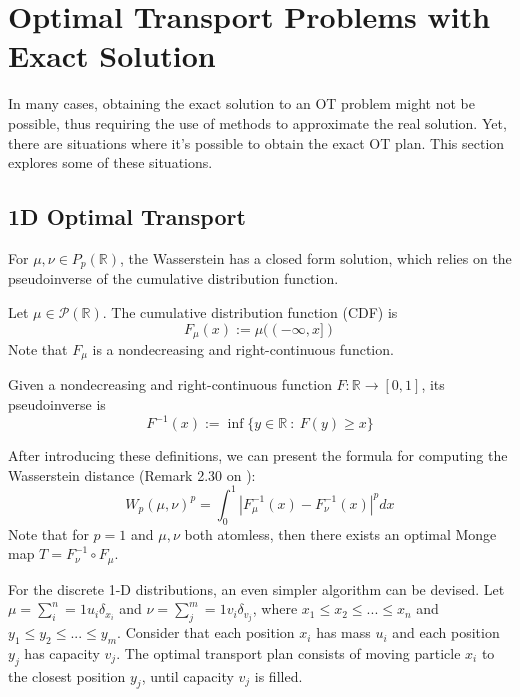 \newpage
\section{Optimal Transport Problems with Exact Solution}

In many cases, obtaining the exact solution to an OT problem might not be possible,
thus requiring the use of methods to approximate the real solution. Yet,
there are situations where it's possible to obtain the exact OT plan. This section
explores some of these situations.

\subsection{1D Optimal Transport}

\label{sec:1dOT}
For $\mu,\nu \in P_p(\mathbb R)$, the Wasserstein has a closed form solution, which
relies on the pseudoinverse of the cumulative distribution function.
\begin{definition}
  Let $\mu \in \mathcal P(\mathbb R)$. The cumulative distribution function (CDF) is
  \begin{equation}
    F_\mu(x) := \mu((-\infty,x])
  \end{equation}
  Note that $F_\mu$ is a nondecreasing and right-continuous function.
  \label{def:cumulativefunction}
\end{definition}

\begin{definition}
  Given a nondecreasing and right-continuous function $F:\mathbb R \to [0,1]$,
  its pseudoinverse is
  \begin{equation}
    F^{-1}(x):= \inf\{
    y \in \mathbb R \ : \ F(y) \geq x
    \}
  \end{equation}
  \label{def:pseudoinverse}
\end{definition}
After introducing these definitions, we can present the formula for computing the Wasserstein
distance (Remark 2.30 on \citet{peyre2019computational}):
\begin{equation}
  W_p(\mu,\nu)^p = \int_0^1| F_\mu^{-1}(x)- F_\nu^{-1}(x) |^p dx
\end{equation}
Note that for $p=1$ and $\mu,\nu$ both atomless, then
there exists an optimal Monge map $T = F_\nu^{-1} \circ F_\mu$.

For the discrete 1-D distributions, an even simpler algorithm can be devised. Let
$\mu = \sum^n_i=1 u_i \delta_{x_i}$ and
$\nu = \sum^m_j=1 v_i \delta_{v_j}$, where
$x_1\leq x_2 \leq ... \leq x_n$ and
$y_1\leq y_2 \leq ... \leq y_m$. Consider that each position $x_i$ has mass $u_i$
and each position $y_j$ has capacity $v_j$. The optimal transport plan
consists of moving particle $x_i$
to the closest position $y_j$, until capacity $v_j$ is filled.

